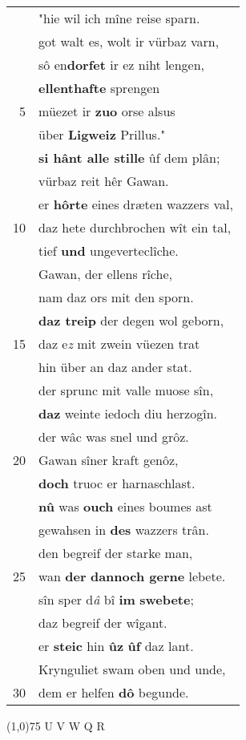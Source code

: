 \documentclass[8pt,a4paper,notitlepage]{article}
\begin{document}
\begin{table}[ht]
\begin{minipage}[t]{0.5\linewidth}
\begin{tabular}{rl}
 & "hie wil ich mîne reise sparn.\\ 
 & got walt es, wolt ir vürbaz varn,\\ 
 & sô en\textbf{dorfet} ir ez niht lengen,\\ 
 & \textbf{ellenthafte} sprengen\\ 
5 & müezet ir \textbf{zuo} orse alsus\\ 
 & über \textbf{Ligweiz} Prillus."\\ 
 & \textbf{si hânt alle stille} ûf dem plân;\\ 
 & vürbaz reit hêr Gawan.\\ 
 & er \textbf{hôrte} eines dræten wazzers val,\\ 
10 & daz hete durchbrochen wît ein tal,\\ 
 & tief \textbf{und} ungeverteclîche.\\ 
 & Gawan, der ellens rîche,\\ 
 & nam daz ors mit den sporn.\\ 
 & \textbf{daz treip} der degen wol geborn,\\ 
15 & daz e\textit{z} mit zwein vüezen trat\\ 
 & hin über an daz ander stat.\\ 
 & der sprunc mit valle muose sîn,\\ 
 & \textbf{daz} weinte iedoch diu herzogîn.\\ 
 & der wâc was snel und grôz.\\ 
20 & Gawan sîner kraft genôz,\\ 
 & \textbf{doch} truoc er harnaschlast.\\ 
 & \textbf{nû} was \textbf{ouch} eines boumes ast\\ 
 & gewahsen in \textbf{des} wazzers trân.\\ 
 & den begreif der starke man,\\ 
25 & wan \textbf{der} \textbf{dannoch gerne} lebete.\\ 
 & sîn sper d\textit{â} bî \textbf{im} \textbf{swebete};\\ 
 & daz begreif der wîgant.\\ 
 & er \textbf{steic} hin \textbf{ûz} \textbf{ûf} daz lant.\\ 
 & Krynguliet swam oben und unde,\\ 
30 & dem er helfen \textbf{dô} begunde.\\ 
\end{tabular}
\scriptsize
\line(1,0){75} \newline
U V W Q R \newline

\end{minipage}
\end{table}
\end{document}
